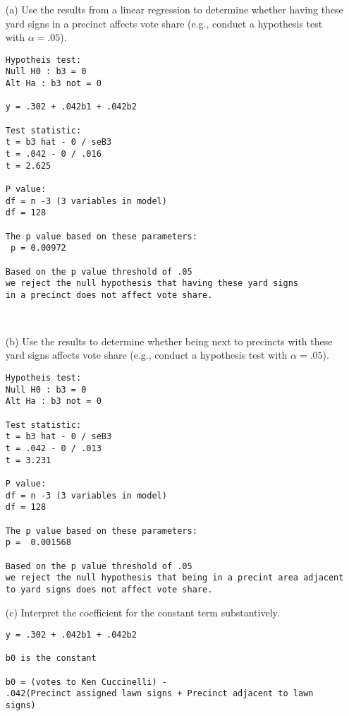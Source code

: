 \documentclass[12pt,letterpaper]{article}
\begin{document}
\vspace{.5cm}
\begin{enumerate}
	\item [(a)] Use the results from a linear regression to determine whether having these yard signs in a precinct affects vote share (e.g., conduct a hypothesis test with $\alpha = .05$).
 \begin{verbatim}
Hypotheis test:
Null H0 : b3 = 0
Alt Ha : b3 not = 0

y = .302 + .042b1 + .042b2
  
Test statistic:
t = b3 hat - 0 / seB3
t = .042 - 0 / .016
t = 2.625
  
P value:
df = n -3 (3 variables in model)
df = 128 
  
The p value based on these parameters:
 p = 0.00972

Based on the p value threshold of .05
we reject the null hypothesis that having these yard signs 
in a precinct does not affect vote share.



 \end{verbatim}
	
	\newpage		
	\item [(b)]  Use the results to determine whether being
	next to precincts with these yard signs affects vote
	share (e.g., conduct a hypothesis test with $\alpha = .05$).

 \begin{verbatim}
Hypotheis test:
Null H0 : b3 = 0
Alt Ha : b3 not = 0

Test statistic:
t = b3 hat - 0 / seB3
t = .042 - 0 / .013
t = 3.231

P value:
df = n -3 (3 variables in model)
df = 128 

The p value based on these parameters:
p =  0.001568

Based on the p value threshold of .05
we reject the null hypothesis that being in a precint area adjacent 
to yard signs does not affect vote share.

 \end{verbatim}
	
	\vspace{7cm}
	\item [(c)] Interpret the coefficient for the constant term substantively.
	\vspace{1cm}
 \begin{verbatim}
y = .302 + .042b1 + .042b2

b0 is the constant

b0 = (votes to Ken Cuccinelli) - 
.042(Precinct assigned lawn signs + Precinct adjacent to lawn signs)


\end{verbatim}
\end{enumerate}
\end{document}
